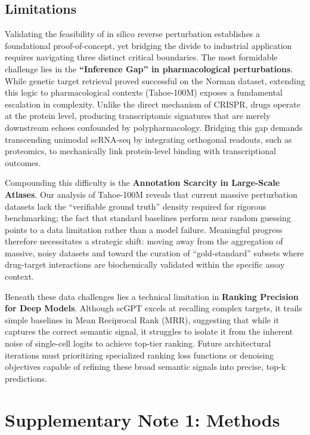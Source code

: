 \documentclass{article}
\begin{document}
\subsection{Limitations}
Validating the feasibility of in silico reverse perturbation establishes a foundational proof-of-concept, yet bridging the divide to industrial application requires navigating three distinct critical boundaries. The most formidable challenge lies in the \textbf{``Inference Gap'' in pharmacological perturbations}. While genetic target retrieval proved successful on the Norman dataset, extending this logic to pharmacological contexts (Tahoe-100M) exposes a fundamental escalation in complexity. Unlike the direct mechanism of CRISPR, drugs operate at the protein level, producing transcriptomic signatures that are merely downstream echoes confounded by polypharmacology. Bridging this gap demands transcending unimodal scRNA-seq by integrating orthogonal readouts, such as proteomics, to mechanically link protein-level binding with transcriptional outcomes.

Compounding this difficulty is the \textbf{Annotation Scarcity in Large-Scale Atlases}. Our analysis of Tahoe-100M reveals that current massive perturbation datasets lack the ``verifiable ground truth'' density required for rigorous benchmarking; the fact that standard baselines perform near random guessing points to a data limitation rather than a model failure. Meaningful progress therefore necessitates a strategic shift: moving away from the aggregation of massive, noisy datasets and toward the curation of ``gold-standard'' subsets where drug-target interactions are biochemically validated within the specific assay context.

Beneath these data challenges lies a technical limitation in \textbf{Ranking Precision for Deep Models}. Although scGPT excels at recalling complex targets, it trails simple baselines in Mean Reciprocal Rank (MRR), suggesting that while it captures the correct semantic signal, it struggles to isolate it from the inherent noise of single-cell logits to achieve top-tier ranking. Future architectural iterations must prioritizing specialized ranking loss functions or denoising objectives capable of refining these broad semantic signals into precise, top-k predictions.

\newpage


\clearpage
\appendix
\renewcommand{\thesection}{Appendix \Alph{section}}

\section{Supplementary Note 1: Methods}
\end{document}
